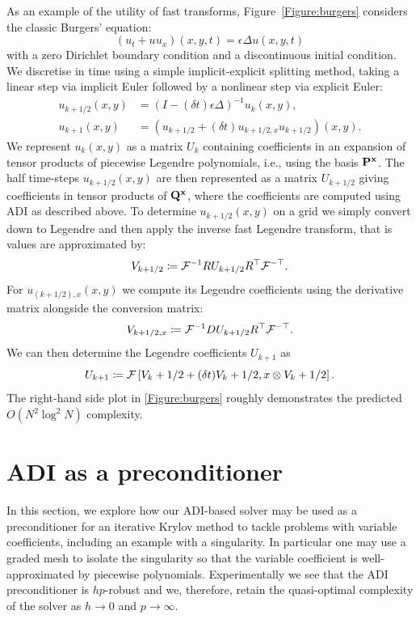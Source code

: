\documentclass[hidelinks,onefignum,onetabnum]{siamart220329}
\def\bfP{{\bf P}}
\def\bfx{{\bf x}}
\def\bfQ{{\bf Q}}
\def\br[#1]{\left[{#1}\right]}
\def\figref#1{Figure~\ref{Figure:#1}}
\begin{document}
As an example of the utility of fast transforms,  \figref{burgers}  considers the classic Burgers' equation:
\[
	(u_t+ u u_x)(x,y,t) = \epsilon \Delta u(x,y,t)
\]
with a zero Dirichlet boundary condition and a discontinuous initial condition. We discretise in time using a simple implicit-explicit splitting method, taking a linear step via implicit Euler followed by a nonlinear step via explicit Euler:
\begin{align*}
u_{k+1/2}(x,y) &= (I - (\delta t)  \epsilon \Delta)^{-1} u_k(x,y),\\
u_{k+1}(x,y) &= (u_{k+1/2} + (\delta t) u_{k+1/2,x} u_{k+1/2})(x,y).
\end{align*}
We represent $u_k(x,y)$ as a matrix $U_k$ containing coefficients in an expansion of  tensor products of piecewise Legendre polynomials, i.e., using the basis $\bfP^\bfx$. The half time-steps $u_{k+1/2}(x,y)$ are then represented as a matrix $U_{k+1/2}$ giving coefficients in tensor products of $\bfQ^\bfx$, where the coefficients are computed using ADI as described above.  To determine $u_{k+1/2}(x,y)$ on a grid we simply convert down to Legendre and then apply the inverse fast Legendre transform, that is  values are approximated by:
\[
	V_{k+1/2} \coloneqq {\cal F}^{-1}R U_{k+1/2}R^\top {\cal F}^{-\top}.
\]
For $u_{(k+1/2),x}(x,y)$ we compute its Legendre coefficients using  the derivative matrix
alongside the conversion matrix:
\[
	V_{k+1/2,x} \coloneqq {\cal F}^{-1}D U_{k+1/2}R^\top {\cal F}^{-\top}.
\]
We can then determine the Legendre coefficients $U_{k+1}$ as
\[
	U_{k+1} \coloneqq {\cal F} \br[V_{k+1/2} + (\delta t) V_{k+1/2,x} \otimes V_{k+1/2}].
\]
The right-hand side plot in \cref{Figure:burgers} roughly demonstrates the predicted $O(N^2 \log^2 N)$ complexity.



\section{ADI as a preconditioner}
\label{Section:Preconditioning}

In this section, we explore how our ADI-based solver may be used as a preconditioner for an iterative Krylov method to tackle problems with variable coefficients, including an example with a singularity. In particular one may use a graded  mesh to isolate the singularity so that the variable coefficient is well-approximated by piecewise polynomials. Experimentally we see that the ADI preconditioner is $hp$-robust and we, therefore, retain the quasi-optimal complexity of the solver as $h \to 0$ and $p \to \infty$. 
\end{document}
